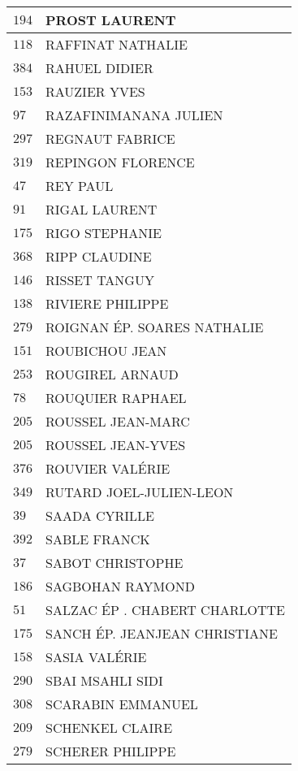 \begin{xltabular}{\linewidth}{|l|X|}
    \hline
    $194$ & PROST LAURENT \\
    \hline
    $118$ & RAFFINAT NATHALIE \\
    \hline
    $384$ & RAHUEL DIDIER \\
    \hline
    $153$ & RAUZIER YVES \\
    \hline
    $97$ & RAZAFINIMANANA JULIEN \\
    \hline
    $297$ & REGNAUT FABRICE \\
    \hline
    $319$ & REPINGON FLORENCE \\
    \hline
    $47$ & REY PAUL \\
    \hline
    $91$ & RIGAL LAURENT \\
    \hline
    $175$ & RIGO STEPHANIE \\
    \hline
    $368$ & RIPP CLAUDINE \\
    \hline
    $146$ & RISSET TANGUY \\
    \hline
    $138$ & RIVIERE PHILIPPE \\
    \hline
    $279$ & ROIGNAN ÉP. SOARES NATHALIE \\
    \hline
    $151$ & ROUBICHOU JEAN \\
    \hline
    $253$ & ROUGIREL ARNAUD \\
    \hline
    $78$ & ROUQUIER RAPHAEL \\
    \hline
    $205$ & ROUSSEL JEAN-MARC \\
    \hline
    $205$ & ROUSSEL JEAN-YVES \\
    \hline
    $376$ & ROUVIER VALÉRIE \\
    \hline
    $349$ & RUTARD JOEL-JULIEN-LEON \\
    \hline
    $39$ & SAADA CYRILLE \\
    \hline
    $392$ & SABLE FRANCK \\
    \hline
    $37$ & SABOT CHRISTOPHE \\
    \hline
    $186$ & SAGBOHAN RAYMOND \\
    \hline
    $51$ & SALZAC ÉP . CHABERT CHARLOTTE \\
    \hline
    $175$ & SANCH ÉP. JEANJEAN CHRISTIANE \\
    \hline
    $158$ & SASIA VALÉRIE \\
    \hline
    $290$ & SBAI MSAHLI SIDI \\
    \hline
    $308$ & SCARABIN EMMANUEL \\
    \hline
    $209$ & SCHENKEL CLAIRE \\
    \hline
    $279$ & SCHERER PHILIPPE \\

\end{xltabular}
